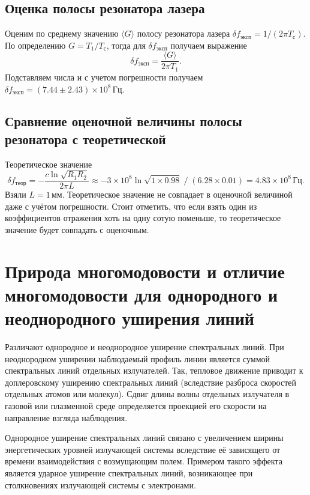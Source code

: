 \documentclass[12pt]{article}
\begin{document}
	\subsection{Оценка полосы резонатора лазера}

	Оценим по среднему значению $\langle G \rangle$ полосу резонатора лазера $\delta f_\text{эксп} = 1/(2\pi T_\text{с})$. По определению $G = T_1 / T_\text{с}$, тогда для $\delta f_\text{эксп}$ получаем выражение
	\begin{equation}
		\delta f_\text{эксп} = \frac{\langle G \rangle}{2\pi T_1}.
	\end{equation}
	Подставляем числа и с учетом погрешности получаем $\delta f_\text{эксп} = (7.44\pm2.43)\times10^8\,\text{Гц}$.

	\subsection{Сравнение оценочной величины полосы резонатора с теоретической}
	Теоретическое значение $$\delta f_\text{теор} = -\frac{c \ln{\sqrt{R_1 R_2}}}{2\pi L} \approx - 3\times10^8 \ln{\sqrt{1\times 0.98}}\; /\;(6.28 \times 0.01) = 4.83\times10^8\,\text{Гц}.$$ Взяли $L=1\,\text{мм}$. Теоретическое значение не совпадает в оценочной величиной даже с учётом погрешности. Стоит отметить, что если взять один из коэффициентов отражения хоть на одну сотую поменьше, то теоретическое значение будет совпадать с оценочным.

	\section{Природа многомодовости и отличие многомодовости для однородного и неоднородного уширения линий}

	Различают однородное и неоднородное уширение спектральных линий. При неоднородном уширении наблюдаемый профиль линии является суммой спектральных линий отдельных излучателей. Так, тепловое движение приводит к доплеровскому уширению спектральных линий (вследствие разброса скоростей отдельных атомов или молекул). Сдвиг длины волны отдельных излучателя в газовой или плазменной среде определяется проекцией его скорости на направление взгляда наблюдения.

	Однородное уширение спектральных линий связано с увеличением ширины энергетических уровней излучающей системы вследствие её зависящего от времени взаимодействия с возмущающим полем. Примером такого эффекта является ударное уширение спектральных линий, возникающее при столкновениях излучающей системы с электронами.
\end{document}

